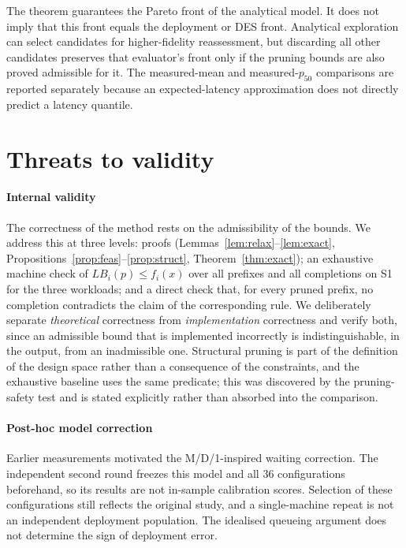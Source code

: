 \documentclass[preprint,11pt,3p]{elsarticle}
\theoremstyle{plain}
\theoremstyle{definition}
\newcommand{\LB}{\mathit{LB}}
\begin{document}
The theorem guarantees the Pareto front of the analytical model. It does not imply that
this front equals the deployment or DES front. Analytical exploration can select
candidates for higher-fidelity reassessment, but discarding all other candidates preserves
that evaluator's front only if the pruning bounds are also proved admissible for it.
The measured-mean and measured-$p_{50}$ comparisons are reported separately because
an expected-latency approximation does not directly predict a latency quantile.
\section{Threats to validity}
\label{sec:threats}

\paragraph{Internal validity}
The correctness of the method rests on the admissibility of the bounds. We address this
at three levels: proofs (Lemmas~\ref{lem:relax}--\ref{lem:exact},
Propositions~\ref{prop:feas}--\ref{prop:struct}, Theorem~\ref{thm:exact}); an exhaustive
machine check of $\LB_i(p)\le f_i(x)$ over all prefixes and all completions on S1 for the
three workloads; and a direct check that, for every pruned prefix, no completion
contradicts the claim of the corresponding rule. We deliberately separate \emph{theoretical}
correctness from \emph{implementation} correctness and verify both, since an admissible
bound that is implemented incorrectly is indistinguishable, in the output, from an
inadmissible one. Structural pruning is part of the definition of the design space rather
than a consequence of the constraints, and the exhaustive baseline uses the same
predicate; this was discovered by the pruning-safety test and is stated explicitly rather
than absorbed into the comparison.

\paragraph{Post-hoc model correction}
Earlier measurements motivated the M/D/1-inspired waiting correction. The independent
second round freezes this model and all 36 configurations beforehand, so its results are
not in-sample calibration scores. Selection of these configurations still reflects the
original study, and a single-machine repeat is not an independent deployment population.
The idealised queueing argument does not determine the sign of deployment error.
\end{document}

